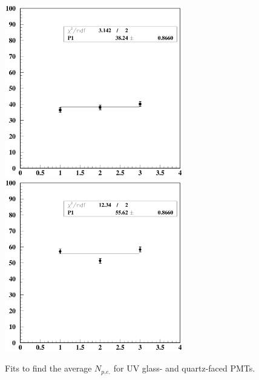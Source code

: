 \begin{figure}
\hspace{0.5cm}
\begin{centering}
\includegraphics[height=7.5cm]{PMT-studies/uv.eps}
\includegraphics[height=7.5cm]{PMT-studies/qt.eps}
\vspace{0.5cm}
\caption{\small{Fits to find the average $N_{p.e.}$ for UV glass- and 
quartz-faced PMTs.}}
\label{avg_numphe}
\end{centering}
\end{figure}

